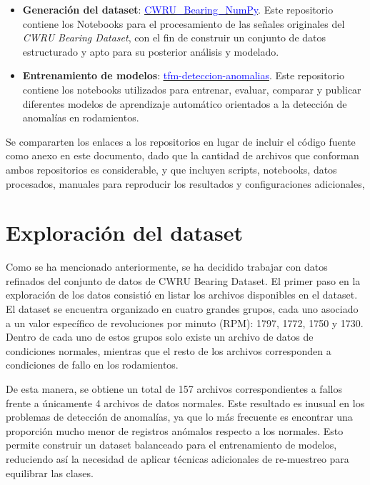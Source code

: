 \documentclass[11pt,a4paper,spanish]{book}
\numberwithin{equation}{chapter}
\numberwithin{figure}{chapter}
\begin{document}
\begin{itemize}
    \item \textbf{Generación del dataset}: 
    \href{https://github.com/jelambrar96-unir/CWRU_Bearing_NumPy}
    {\underline{\textcolor{blue}{CWRU\_Bearing\_NumPy}}}.
    Este repositorio contiene los Notebooks para el procesamiento de las señales originales 
    del \textit{CWRU Bearing Dataset}, con el fin de construir un conjunto de datos 
    estructurado y apto para su posterior análisis y modelado.
    
    \item \textbf{Entrenamiento de modelos}: 
    \href{https://github.com/jelambrar96-unir/tfm-deteccion-anomalias}
    {\underline{\textcolor{blue}{tfm-deteccion-anomalias}}}. 
    Este repositorio contiene los notebooks utilizados para entrenar, evaluar, comparar 
    y publicar diferentes modelos de aprendizaje automático orientados a la detección de 
    anomalías en rodamientos.
\end{itemize}

Se compararten los enlaces a los repositorios en lugar de incluir el código fuente como 
anexo en este documento, dado que la cantidad de archivos que conforman ambos repositorios
es considerable, y que incluyen scripts, notebooks, datos procesados, manuales para 
reproducir los resultados y configuraciones adicionales, 


\section{Exploración del dataset}

Como se ha mencionado anteriormente, se ha decidido trabajar con datos refinados del 
conjunto de datos de CWRU Bearing Dataset. El primer paso en la exploración de los datos
consistió en listar los archivos disponibles en el dataset. El dataset se encuentra 
organizado en cuatro grandes grupos, cada uno asociado a un valor específico de 
revoluciones por minuto (RPM): 1797, 1772, 1750 y 1730. Dentro de cada uno de estos 
grupos solo existe un archivo de datos de condiciones normales, mientras que el resto de
los archivos corresponden a condiciones de fallo en los rodamientos.


De esta manera, se obtiene un total de 157 archivos correspondientes a fallos frente a 
únicamente 4 archivos de datos normales. Este resultado es inusual en los problemas de 
detección de anomalías, ya que lo más frecuente es encontrar una proporción mucho menor 
de registros anómalos respecto a los normales. Esto permite construir un dataset 
balanceado para el entrenamiento de modelos, reduciendo así la necesidad de aplicar 
técnicas adicionales de re-muestreo para equilibrar las clases.
\end{document}
